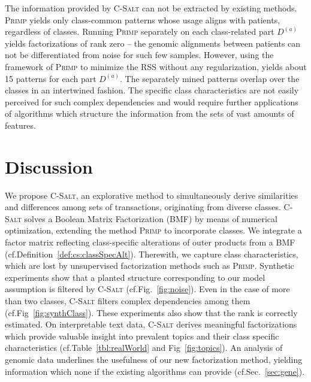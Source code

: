 The information provided by \textsc{C-Salt} can not be extracted by existing methods. \textsc{Primp} yields only class-common patterns whose usage aligns with patients, regardless of classes. Running \textsc{Primp} separately on each class-related part $D^{(a)}$ yields factorizations of rank zero -- the genomic alignments between patients can not be differentiated from noise for such few samples.  
However, using the framework of \textsc{Primp} to minimize the RSS without any regularization, yields about 15 patterns for each part $D^{(a)}$. The separately mined patterns overlap over the classes in an intertwined fashion. The specific class characteristics are not easily perceived for such complex dependencies and would require further applications of algorithms which structure the information from the sets of vast amounts of features.
\section{Discussion}
We propose \textsc{C-Salt}, an explorative method to simultaneously derive similarities and differences among sets of transactions, originating from diverse classes. \textsc{C-Salt} solves a Boolean Matrix Factorization (BMF) by means of numerical optimization, extending the method \textsc{Primp} to incorporate classes. We integrate a factor matrix reflecting class-specific alterations of outer products from a BMF (cf.\@ Definition~\ref{def:cs:classSpecAlt}). Therewith, we capture class characteristics, which are lost by unsupervised factorization methods such as \textsc{Primp}. Synthetic experiments show that a planted structure corresponding to our model assumption is filtered by \textsc{C-Salt} (cf.\@ Fig.~\ref{fig:noise}). Even in the case of more than two classes, \textsc{C-Salt} filters complex dependencies among them (cf.\@ Fig~\ref{fig:synthClass}). These experiments also show that the rank is correctly estimated. On interpretable text data, \textsc{C-Salt} derives meaningful factorizations which provide valuable insight into prevalent topics and their class specific characteristics (cf.\@ Table~\ref{tbl:realWorld} and Fig~\ref{fig:topics}). An analysis of genomic data underlines the usefulness of our new factorization method, yielding information which none if the existing algorithms can provide (cf.\@ Sec.~\ref{sec:gene}).
